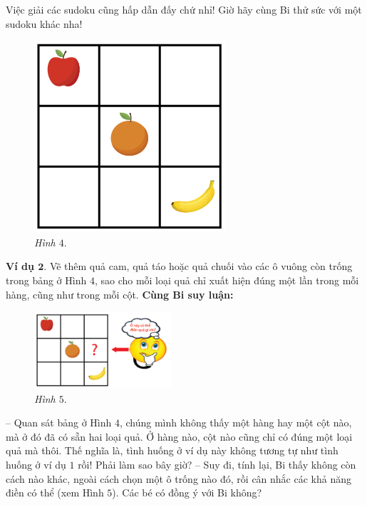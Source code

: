 	Việc giải các sudoku cũng hấp dẫn đấy chứ nhỉ! Giờ hãy cùng Bi thử sức với một sudoku  khác nha!
	\vskip 0.1cm
	\begin{figure}
		\vspace*{-10pt}
		\centering
		\captionsetup{labelformat=empty, justification=centering}
		\includegraphics[scale=0.4]{hinh4}
		\caption{\textit{\small Hình $4.$}}
		\vspace*{-15pt}
	\end{figure}
	\textbf{Ví dụ $\pmb2.$} Vẽ thêm quả cam, quả táo hoặc quả chuối vào các ô vuông còn trống trong bảng ở Hình $4$, sao cho mỗi loại quả chỉ xuất hiện đúng một lần trong mỗi hàng, cũng như trong mỗi cột.
	\vskip 0.1cm
	\textbf{Cùng Bi suy luận:}
	\vskip 0.15cm
	\begin{figure}
		\centering
		\vspace*{-5pt}
		\captionsetup{labelformat= empty, justification=centering}
		\includegraphics[width=0.45\textwidth]{hinh5}
		\caption{\small\textit{Hình $5.$}}
		\vspace*{-5pt}
	\end{figure}
	-- Quan sát bảng ở Hình $4$, chúng mình không thấy một hàng hay một cột nào, mà ở đó đã có sẵn hai loại quả. Ở hàng nào, cột nào cũng chỉ có đúng một loại quả mà thôi. Thế nghĩa là,  tình huống ở ví dụ này không tương tự như tình huống ở ví dụ $1$ rồi! Phải làm sao bây giờ?
	\vskip 0.1cm	
	-- Suy đi, tính lại, Bi thấy không còn cách nào khác, ngoài cách chọn một ô trống nào đó, rồi cân nhắc các khả năng điền có thể (xem Hình $5$). Các bé có đồng ý với Bi không?
